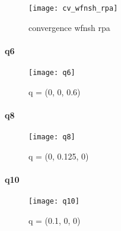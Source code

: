 \begin{figure}[!h]\label{CVwfnshRPA}
    \centering
    \texttt{[image: cv\_wfnsh\_rpa]}
    \caption{convergence wfnsh rpa}
\end{figure}

\paragraph{q6}
\begin{figure}[!h]
    \centering
    \texttt{[image: q6]}
    \caption{q = (0, 0, 0.6)}
\end{figure}


\paragraph{q8}
\begin{figure}[!h]
    \centering
    \texttt{[image: q8]}
    \caption{q = (0, 0.125, 0)}
\end{figure}


\paragraph{q10}
\begin{figure}[!h]
    \centering
    \texttt{[image: q10]}
    \caption{q = (0.1, 0, 0)}
\end{figure}
